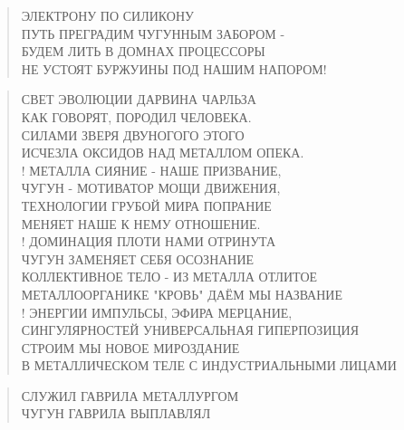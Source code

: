 \poemtitle{***}
\begin{verse}
ЭЛЕКТРОНУ ПО СИЛИКОНУ\\
ПУТЬ ПРЕГРАДИМ ЧУГУННЫМ ЗАБОРОМ -\\
БУДЕМ ЛИТЬ В ДОМНАХ ПРОЦЕССОРЫ\\
НЕ УСТОЯТ БУРЖУИНЫ ПОД НАШИМ НАПОРОМ!
\end{verse}

\poemtitle{***}
\begin{verse}
СВЕТ ЭВОЛЮЦИИ ДАРВИНА ЧАРЛЬЗА\\
КАК ГОВОРЯТ, ПОРОДИЛ ЧЕЛОВЕКА.\\
СИЛАМИ ЗВЕРЯ ДВУНОГОГО ЭТОГО\\
ИСЧЕЗЛА ОКСИДОВ НАД МЕТАЛЛОМ ОПЕКА.\\!
МЕТАЛЛА СИЯНИЕ - НАШЕ ПРИЗВАНИЕ,\\
ЧУГУН - МОТИВАТОР МОЩИ ДВИЖЕНИЯ,\\
ТЕХНОЛОГИИ ГРУБОЙ МИРА ПОПРАНИЕ\\
МЕНЯЕТ НАШЕ К НЕМУ ОТНОШЕНИЕ.\\!
ДОМИНАЦИЯ ПЛОТИ НАМИ ОТРИНУТА\\
ЧУГУН ЗАМЕНЯЕТ СЕБЯ ОСОЗНАНИЕ\\
КОЛЛЕКТИВНОЕ ТЕЛО - ИЗ МЕТАЛЛА ОТЛИТОЕ\\
МЕТАЛЛООРГАНИКЕ "КРОВЬ" ДАЁМ МЫ НАЗВАНИЕ\\!
ЭНЕРГИИ ИМПУЛЬСЫ, ЭФИРА МЕРЦАНИЕ,\\
СИНГУЛЯРНОСТЕЙ УНИВЕРСАЛЬНАЯ ГИПЕРПОЗИЦИЯ\\
СТРОИМ МЫ НОВОЕ МИРОЗДАНИЕ\\
В МЕТАЛЛИЧЕСКОМ ТЕЛЕ С ИНДУСТРИАЛЬНЫМИ ЛИЦАМИ
\end{verse}

\poemtitle{***}
\begin{verse}
СЛУЖИЛ ГАВРИЛА МЕТАЛЛУРГОМ\\
ЧУГУН ГАВРИЛА ВЫПЛАВЛЯЛ
\end{verse}

